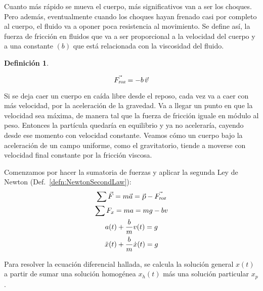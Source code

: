 \documentclass[a5paper,12pt,twoside]{book}
\newtheorem{defn}{{Definición}}[chapter]
\begin{document}
Cuanto más rápido se mueva el cuerpo, más significativos van a ser los choques. Pero además, eventualmente cuando los choques hayan frenado casi por completo al cuerpo, el fluido va a oponer poca resistencia al movimiento. Se define así, la fuerza de fricción en fluidos que va a ser proporcional a la velocidad del cuerpo y a una constante $(b)$ que está relacionada con la viscosidad del fluido.

\begin{mdframed}[style=MyFrame1]
    \begin{defn}
        \label{defn:fluidFrictionForce}
    \end{defn}
    \begin{equation*}
        \Vec{{{F}_\textsl{{roz}}}} = - b \, \Vec{v}
    \end{equation*}
\end{mdframed}

Si se deja caer un cuerpo en caída libre desde el reposo, cada vez va a caer con más velocidad, por la aceleración de la gravedad. Va a llegar un punto en que la velocidad sea máxima, de manera tal que la fuerza de fricción iguale en módulo al peso. Entonces la partícula quedaría en equilibrio y ya no aceleraría, cayendo desde ese momento con velocidad constante. Veamos cómo un cuerpo bajo la aceleración de un campo uniforme, como el gravitatorio, tiende a moverse con velocidad final constante por la fricción viscosa.

\begin{center}
    \def\svgwidth{0.8\linewidth}
    
\end{center}

Comenzamos por hacer la sumatoria de fuerzas y aplicar la segunda Ley de Newton (Def.\ \ref{defn:NewtonSecondLaw}):
\begin{gather*}
    \sum \Vec{F} = m\Vec{a} = \Vec{\textsl{p}} - \Vec{{{F}_\textsl{{roz}}}}
    \\
    \sum F_x = ma = mg - bv
    \\
    a(t) + \frac{b}{m} v(t) = g
    \\
    \ddot{x}(t) + \frac{b}{m} \dot{x}(t) = g
\end{gather*}

Para resolver la ecuación diferencial hallada, se calcula la solución general $x(t)$ a partir de sumar una solución homogénea $x_h(t)$ más una solución particular $x_p$.
\end{document}
